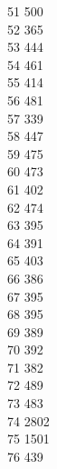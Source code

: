 { 51	500 \\
 52	365 \\
 53	444 \\
 54	461 \\
 55	414 \\
 56	481 \\
 57	339 \\
 58	447 \\
 59	475 \\
 60	473 \\
 61	402 \\
 62	474 \\
 63	395 \\
 64	391 \\
 65	403 \\
 66	386 \\
 67	395 \\
 68	395 \\
 69	389 \\
 70	392 \\
 71	382 \\
 72	489 \\
 73	483 \\
 74	2802 \\
 75	1501 \\
 76	439 \\
}
